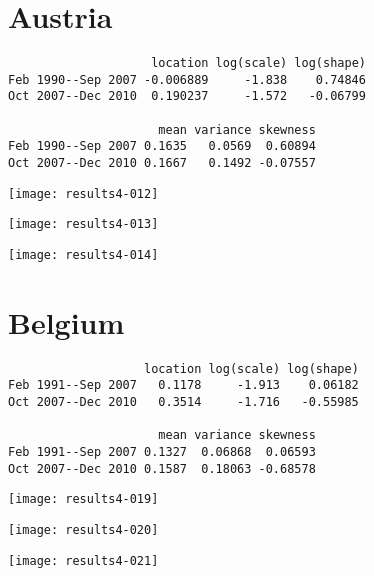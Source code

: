 \documentclass[a4paper]{article}
\begin{document}









\section*{Austria}


\begin{verbatim}
                    location log(scale) log(shape)
Feb 1990--Sep 2007 -0.006889     -1.838    0.74846
Oct 2007--Dec 2010  0.190237     -1.572   -0.06799

                     mean variance skewness
Feb 1990--Sep 2007 0.1635   0.0569  0.60894
Oct 2007--Dec 2010 0.1667   0.1492 -0.07557

\end{verbatim}

\begin{center}
\texttt{[image: results4-012]}

\texttt{[image: results4-013]}

\texttt{[image: results4-014]}
\end{center}

\newpage

\section*{Belgium}


\begin{verbatim}
                   location log(scale) log(shape)
Feb 1991--Sep 2007   0.1178     -1.913    0.06182
Oct 2007--Dec 2010   0.3514     -1.716   -0.55985

                     mean variance skewness
Feb 1991--Sep 2007 0.1327  0.06868  0.06593
Oct 2007--Dec 2010 0.1587  0.18063 -0.68578

\end{verbatim}

\begin{center}
\texttt{[image: results4-019]}

\texttt{[image: results4-020]}

\texttt{[image: results4-021]}
\end{center}
\end{document}
